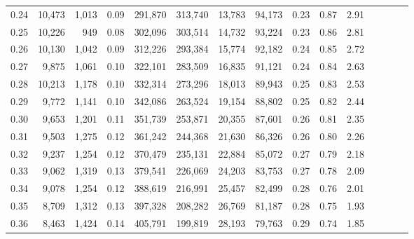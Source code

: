 \begin{tabular}{rrrcrrrrrrrrrrr}
0.24 &  10,473 &   1,013 &                                       0.09 &  291,870 &  313,740 &   13,783 &   94,173 &  0.23 &  0.87 &                         2.91 \\
0.25 &  10,226 &     949 &                                       0.08 &  302,096 &  303,514 &   14,732 &   93,224 &  0.23 &  0.86 &                         2.81 \\
0.26 &  10,130 &   1,042 &                                       0.09 &  312,226 &  293,384 &   15,774 &   92,182 &  0.24 &  0.85 &                         2.72 \\
0.27 &   9,875 &   1,061 &                                       0.10 &  322,101 &  283,509 &   16,835 &   91,121 &  0.24 &  0.84 &                         2.63 \\
0.28 &  10,213 &   1,178 &                                       0.10 &  332,314 &  273,296 &   18,013 &   89,943 &  0.25 &  0.83 &                         2.53 \\
0.29 &   9,772 &   1,141 &                                       0.10 &  342,086 &  263,524 &   19,154 &   88,802 &  0.25 &  0.82 &                         2.44 \\
0.30 &   9,653 &   1,201 &                                       0.11 &  351,739 &  253,871 &   20,355 &   87,601 &  0.26 &  0.81 &                         2.35 \\
0.31 &   9,503 &   1,275 &                                       0.12 &  361,242 &  244,368 &   21,630 &   86,326 &  0.26 &  0.80 &                         2.26 \\
0.32 &   9,237 &   1,254 &                                       0.12 &  370,479 &  235,131 &   22,884 &   85,072 &  0.27 &  0.79 &                         2.18 \\
0.33 &   9,062 &   1,319 &                                       0.13 &  379,541 &  226,069 &   24,203 &   83,753 &  0.27 &  0.78 &                         2.09 \\
0.34 &   9,078 &   1,254 &                                       0.12 &  388,619 &  216,991 &   25,457 &   82,499 &  0.28 &  0.76 &                         2.01 \\
0.35 &   8,709 &   1,312 &                                       0.13 &  397,328 &  208,282 &   26,769 &   81,187 &  0.28 &  0.75 &                         1.93 \\
0.36 &   8,463 &   1,424 &                                       0.14 &  405,791 &  199,819 &   28,193 &   79,763 &  0.29 &  0.74 &                         1.85 \\

\end{tabular}
